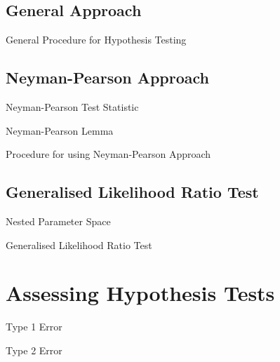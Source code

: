 \documentclass[11pt,a4paper]{article}
\begin{document}
\subsection{General Approach}

\begin{proposition}{General Procedure for Hypothesis Testing}

\end{proposition}

\subsection{Neyman-Pearson Approach}

\begin{definition}{Neyman-Pearson Test Statistic}

\end{definition}

\begin{theorem}{Neyman-Pearson Lemma}

\end{theorem}

\begin{proposition}{Procedure for using Neyman-Pearson Approach}

\end{proposition}

\subsection{Generalised Likelihood Ratio Test}

\begin{definition}{Nested Parameter Space}

\end{definition}

\begin{definition}{Generalised Likelihood Ratio Test}

\end{definition}

\section{Assessing Hypothesis Tests}

\begin{definition}{Type 1 Error}

\end{definition}

\begin{definition}{Type 2 Error}

\end{definition}
\end{document}
